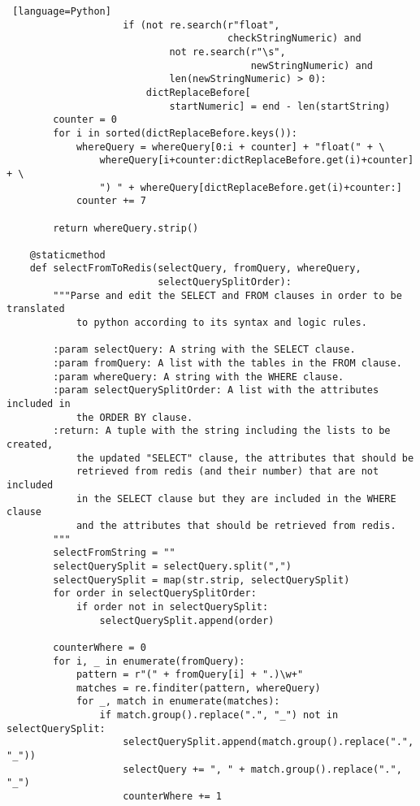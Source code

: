\documentclass[11pt]{article}
\begin{document}
\begin{lstlisting} [language=Python]
                    if (not re.search(r"float",
                                      checkStringNumeric) and
                            not re.search(r"\s",
                                          newStringNumeric) and
                            len(newStringNumeric) > 0):
                        dictReplaceBefore[
                            startNumeric] = end - len(startString)
        counter = 0
        for i in sorted(dictReplaceBefore.keys()):
            whereQuery = whereQuery[0:i + counter] + "float(" + \
                whereQuery[i+counter:dictReplaceBefore.get(i)+counter] + \
                ") " + whereQuery[dictReplaceBefore.get(i)+counter:]
            counter += 7

        return whereQuery.strip()

    @staticmethod
    def selectFromToRedis(selectQuery, fromQuery, whereQuery,
                          selectQuerySplitOrder):
        """Parse and edit the SELECT and FROM clauses in order to be translated
            to python according to its syntax and logic rules.

        :param selectQuery: A string with the SELECT clause.
        :param fromQuery: A list with the tables in the FROM clause.
        :param whereQuery: A string with the WHERE clause.
        :param selectQuerySplitOrder: A list with the attributes included in
            the ORDER BY clause.
        :return: A tuple with the string including the lists to be created,
            the updated "SELECT" clause, the attributes that should be
            retrieved from redis (and their number) that are not included
            in the SELECT clause but they are included in the WHERE clause
            and the attributes that should be retrieved from redis.
        """
        selectFromString = ""
        selectQuerySplit = selectQuery.split(",")
        selectQuerySplit = map(str.strip, selectQuerySplit)
        for order in selectQuerySplitOrder:
            if order not in selectQuerySplit:
                selectQuerySplit.append(order)

        counterWhere = 0
        for i, _ in enumerate(fromQuery):
            pattern = r"(" + fromQuery[i] + ".)\w+"
            matches = re.finditer(pattern, whereQuery)
            for _, match in enumerate(matches):
                if match.group().replace(".", "_") not in selectQuerySplit:
                    selectQuerySplit.append(match.group().replace(".", "_"))
                    selectQuery += ", " + match.group().replace(".", "_")
                    counterWhere += 1


\end{lstlisting}
\end{document}
